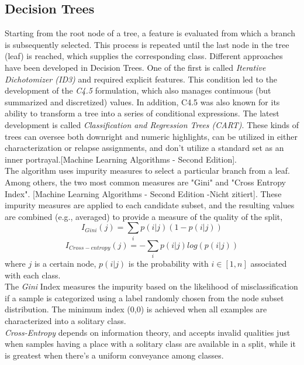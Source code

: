 \documentclass[a4paper, 11pt,titlepage,oneside,openany]{book}
\begin{document}
\subsection{Decision Trees}
Starting from the root node of a tree, a feature is evaluated from which a branch is subsequently selected. This process is repeated until the last node in the tree (leaf) is reached, which supplies the corresponding class. Different approaches have been developed in Decision Trees. One of the first is called \textit{Iterative Dichotomizer (ID3)} and required explicit features. This condition led to the development of the \textit{C4.5} formulation, which also manages continuous (but summarized and discretized) values. In addition, C4.5 was also known for its ability to transform a tree into a series of conditional expressions. The latest development is called \textit{Classification and Regression Trees (CART)}. These kinds of trees can oversee both downright and numeric highlights, can be utilized in either characterization or relapse assignments, and don't utilize a standard set as an inner portrayal.[Machine Learning Algorithms - Second Edition].\\
\noindent The algorithm uses impurity measures to select a particular branch from a leaf. Among others, the two most common measures are "Gini" and "Cross Entropy Index". [Machine Learning Algorithms - Second Edition -Nicht zitiert]. These impurity measures are  applied to each candidate subset, and the resulting values are combined (e.g., averaged) to provide a measure of the quality of the split,
\[
I_{Gini}(j)=\sum_{i}p(i|j)(1-p(i|j))
\]
\[
I_{Cross-entropy}(j)=-\sum_{i}p(i|j)log(p(i|j))
\]
where $j$ is a certain node, $p(i|j)$ is the probability with $i \in [1,n]$ associated with each class.\\
\noindent The \textit{Gini} Index measures the impurity based on the likelihood of misclassification if a sample is categorized using a label randomly chosen from the node subset distribution. The minimum index (0,0) is achieved when all examples are characterized into a solitary class.\\
\noindent \textit{Cross-Entropy} depends on information theory, and accepts invalid qualities just when samples having a place with a solitary class are available in a split, while it is greatest when there's a uniform conveyance among classes.
\end{document}
